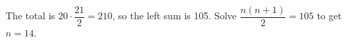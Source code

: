 The total is $20\cdot\dfrac{21}{2}=210$, so the left sum is 105. Solve $\dfrac{n(n+1)}{2}=105$ to get $\boxed{n=14}$.
